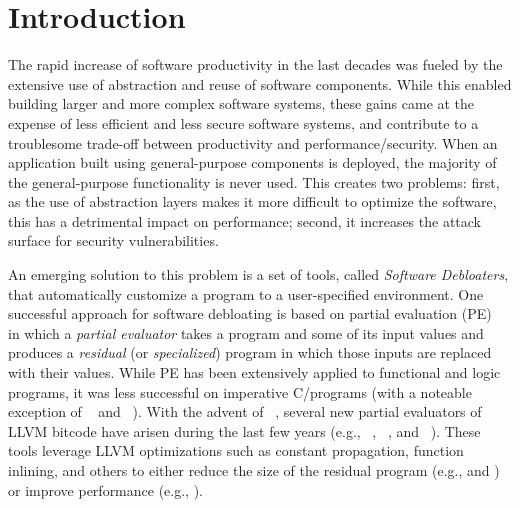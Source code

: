 \section{Introduction}
\label{sec:intro}

The rapid increase of software productivity in the last decades was fueled by the
extensive use of abstraction and reuse of software components. While this
enabled building larger and more complex software systems, these gains came at
the expense of less efficient and less secure software systems, and contribute
to a troublesome trade-off between productivity and performance/security. When
an application built using general-purpose components is deployed, the majority
of the general-purpose functionality is never used. This creates two problems:
first, as the use of abstraction layers makes it more difficult to optimize the
software, this has a detrimental impact on performance; second, it increases the
attack surface for security vulnerabilities.

An emerging solution to this problem is a set of tools, called \emph{Software
  Debloaters}, that automatically customize a program to a user-specified
environment. One successful approach for software debloating is based on partial
evaluation (PE)~\cite{pe-book} in which a \emph{partial evaluator} takes a
program and some of its input values and produces a \emph{residual}
(or \emph{specialized}) program in which those inputs are replaced with their
values.
%
%
While PE has been extensively applied to functional and logic programs, it was
less successful on imperative C/\cpp programs (with a noteable exception of
\cmix~\cite{Andersen94} and \tempo~\cite{Consel98}). With the advent of
\llvm~\cite{llvm}, several new partial evaluators of LLVM bitcode have arisen
during the last few years (e.g., \llpe~\cite{llpe}, \occam~\cite{occam}, and
\trimmer~\cite{trimmer}). These tools leverage LLVM optimizations such as
constant propagation, function inlining, and others to either reduce the size of
the residual program (e.g., \occam and \trimmer) or improve performance (e.g.,
\llpe).

